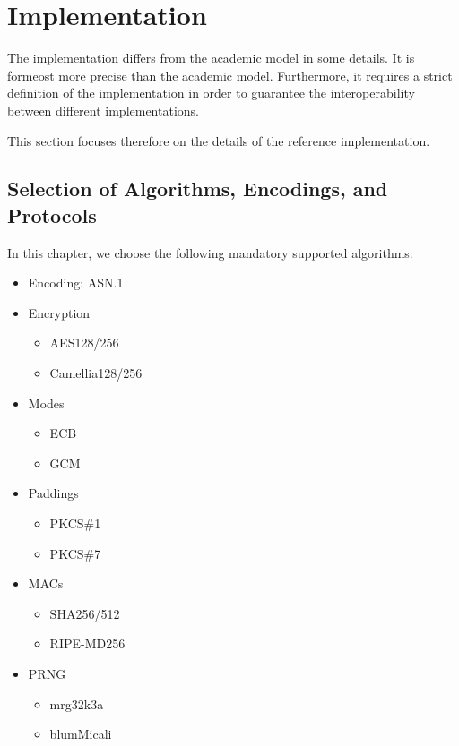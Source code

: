 
\part{Implementation\label{sec:implementation}}
The implementation differs from the academic model in some details. It is formeost more precise than the academic model. Furthermore, it requires a strict definition of the implementation in order to guarantee the interoperability between different implementations.

This section focuses therefore on the details of the reference implementation.

\chapter{Selection of Algorithms, Encodings, and Protocols}
In this chapter, we choose the following mandatory supported algorithms:
\begin{itemize}
	\item Encoding: ASN.1
	\item Encryption
	\begin{itemize}
		\item AES128/256
		\item Camellia128/256
	\end{itemize}
    \item Modes
    \begin{itemize}
    	\item ECB
    	\item GCM
    \end{itemize}
	\item Paddings
	\begin{itemize}
		\item PKCS\#1
		\item PKCS\#7
	\end{itemize}
	\item MACs
	\begin{itemize}
		\item SHA256/512
		\item RIPE-MD256
	\end{itemize}
	\item PRNG
	\begin{itemize}
		\item mrg32k3a
		\item blumMicali
	\end{itemize}
\end{itemize}

